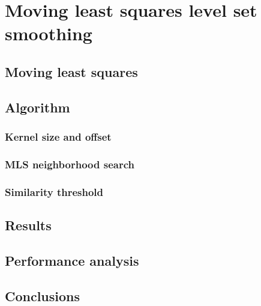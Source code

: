 \chapter{Moving least squares level set smoothing}
\section{Moving least squares}
\section{Algorithm}
\subsection{Kernel size and offset}
\subsection{MLS neighborhood search}
\subsection{Similarity threshold}
\section{Results}
\section{Performance analysis}
\section{Conclusions}